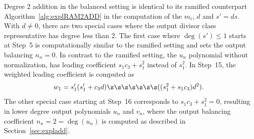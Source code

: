 Degree 2 addition in the balanced setting is identical to its ramified
counterpart Algorithm~\ref{alg:explRAM2ADD} in the computation of the $m_i$, $d$
and $s' = ds$. With $d \neq 0$, there are two special cases where the output
divisor class representative has degree less than 2. The first case where
$\deg(s') \leq 1$ starts at Step~5 is computationally similar to the ramified
setting and sets the output balancing $n_n = 0$.  In contrast to the ramified
setting, the $u_n$ polynomial without normalization, has leading coefficient
$s_1c_3 + s_1^2$ instead of $s_1^2$. In Step~15, the weighted leading
coefficient is computed as
$$ w_1 = s_1'(s_1' + c_3d) \s\s\s\s\s\s\s ((s_1^2 + s_1c_3)d^2). $$ The other
special case starting at Step~16 corresponds to $s_1c_3 + s_1^2 = 0$, resulting
in lower degree output polynomials $u_n$ and $v_n$, where the output balancing
coefficient $n_n = 2 = \deg(u_n)$ is computed as described in
Section~\ref{sec:expladd}. 

